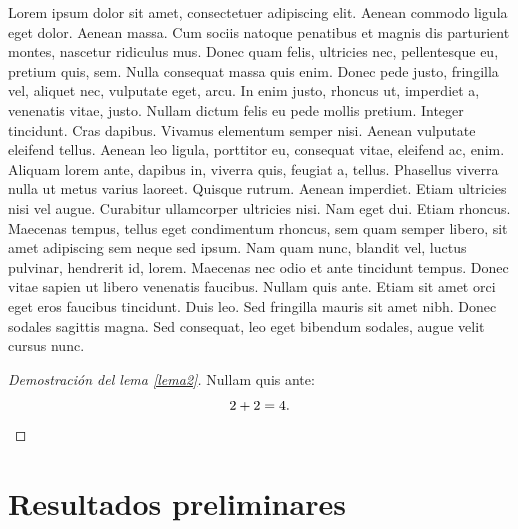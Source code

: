 \documentclass[a4paper,11pt,spanish, twoside, leqno]{tfg-uam}
\theoremstyle{definition}
\begin{document}
Lorem ipsum dolor sit amet, consectetuer adipiscing elit. Aenean commodo ligula eget dolor. Aenean massa. Cum sociis natoque penatibus et magnis dis parturient montes, nascetur ridiculus mus. Donec quam felis, ultricies nec, pellentesque eu, pretium quis, sem. Nulla consequat massa quis enim. Donec pede justo, fringilla vel, aliquet nec, vulputate eget, arcu. In enim justo, rhoncus ut, imperdiet a, venenatis vitae, justo. Nullam dictum felis eu pede mollis pretium. Integer tincidunt. Cras dapibus. Vivamus elementum semper nisi. Aenean vulputate eleifend tellus. Aenean leo ligula, porttitor eu, consequat vitae, eleifend ac, enim. Aliquam lorem ante, dapibus in, viverra quis, feugiat a, tellus. Phasellus viverra nulla ut metus varius laoreet. Quisque rutrum. Aenean imperdiet. Etiam ultricies nisi vel augue. Curabitur ullamcorper ultricies nisi. Nam eget dui. Etiam rhoncus. Maecenas tempus, tellus eget condimentum rhoncus, sem quam semper libero, sit amet adipiscing sem neque sed ipsum. Nam quam nunc, blandit vel, luctus pulvinar, hendrerit id, lorem. Maecenas nec odio et ante tincidunt tempus. Donec vitae sapien ut libero venenatis faucibus. Nullam quis ante. Etiam sit amet orci eget eros faucibus tincidunt. Duis leo. Sed fringilla mauris sit amet nibh. Donec sodales sagittis magna. Sed consequat, leo eget bibendum sodales, augue velit cursus nunc.


\begin{proof}[\sc Demostraci\'on del lema {\rm \ref{lema2}}]
Nullam quis ante:
\begin{equation}
2+2=4.\qedhere
\end{equation}
\end{proof}

\section{Resultados preliminares}
\end{document}
